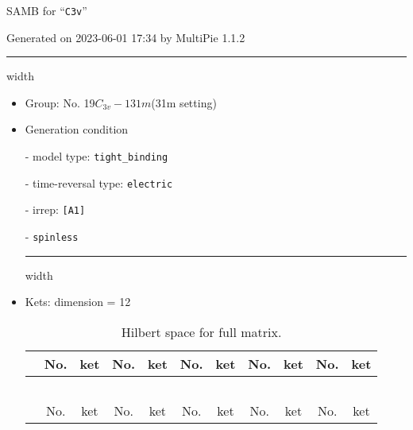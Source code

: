 \documentclass[fleqn,10pt,landscape]{article}
\begin{document}
\setcounter{MaxMatrixCols}{16}

\setlength{\baselineskip}{16pt}
\footnotesize
\begin{center}
\LARGE
SAMB for ``\texttt{C3v}''
\end{center}
\begin{flushright}
Generated on 2023-06-01 17:34 by MultiPie 1.1.2
\end{flushright}
\vspace{1cm}


 \hfil \hrule height 1mm width \textwidth \hfil

\begin{itemize}
\item Group: No. 19\quad$C_{3v}-1$\quad$31m$\quad(31m setting)\quad[ trigonal ]

\vspace{5mm}

\item Generation condition

\quad - model type: \texttt{tight_binding}

\quad - time-reversal type: \texttt{electric}

\quad - irrep: \texttt{[A1]}

\quad - \texttt{spinless}


 \hfil \hrule height 1mm width \textwidth \hfil

\item Kets: dimension = 12
\begin{center}
\renewcommand{\arraystretch}{1.3}
\begin{longtable}{c|cc|cc|cc|cc|cc}
\caption{Hilbert space for full matrix.}
 \\
 \hline \hline
 & No. & ket & No. & ket & No. & ket & No. & ket & No. & ket \\ \hline \endfirsthead

\multicolumn{10}{l}{\tablename\ \thetable{}} \\
 \hline \hline
 & No. & ket & No. & ket & No. & ket & No. & ket & No. & ket \\ \hline \endhead


\end{longtable}
\end{center}
\end{itemize}
\end{document}
